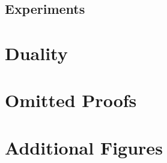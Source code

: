 \documentclass[12pt]{article}
\begin{document}
  \subsection{Experiments}
    

\clearpage



\clearpage
\appendix
% 

\section{Duality}\label{apx:duality}


\section{Omitted Proofs}\label{apx:omit}
\printproofs

\section{Additional Figures}\label{apx:extra}


% 
\end{document}
